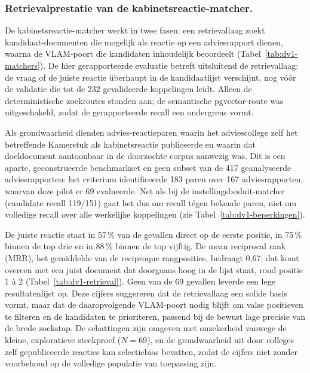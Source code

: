 
\subsubsection{Retrievalprestatie van de kabinetsreactie-matcher.}
De kabinetsreactie-matcher werkt in twee fasen: een retrievallaag zoekt
kandidaat-documenten die mogelijk als reactie op een adviesrapport dienen,
waarna de VLAM-poort die kandidaten inhoudelijk beoordeelt
(Tabel~\ref{tab:dv1-matchers}). De hier gerapporteerde evaluatie betreft
uitsluitend de retrievallaag: de vraag of de juiste reactie \"uberhaupt in de
kandidaatlijst verschijnt, nog v\'o\'or de validatie die tot de 232 gevalideerde
koppelingen leidt. Alleen de deterministische zoekroutes stonden aan; de
semantische pgvector-route was uitgeschakeld, zodat de gerapporteerde recall een
ondergrens vormt.

\noindent Als grondwaarheid dienden advies-reactieparen waarin het adviescollege
zelf het betreffende Kamerstuk als kabinetsreactie publiceerde en waarin dat
doeldocument aantoonbaar in de doorzochte corpus aanwezig was. Dit is een aparte,
geconstrueerde benchmarkset en geen subset van de 417 geanalyseerde
adviesrapporten: het criterium identificeerde 183 paren over 167 adviesrapporten,
waarvan deze pilot er 69 evalueerde. Net als bij de instellingsbesluit-matcher
(candidate recall 119/151) gaat het dus om recall t\'egen bekende paren, niet om
volledige recall over alle werkelijke koppelingen
(zie Tabel~\ref{tab:dv1-beperkingen}).

\noindent De juiste reactie staat in 57\,\% van de gevallen direct op de eerste
positie, in 75\,\% binnen de top drie en in 88\,\% binnen de top vijftig. De mean
reciprocal rank (MRR), het gemiddelde van de reciproque rangposities, bedraagt
0,67; dat komt overeen met een juist document dat doorgaans hoog in de lijst staat,
rond positie 1 \`a 2 (Tabel~\ref{tab:dv1-retrieval}). Geen van de 69 gevallen
leverde een lege resultatenlijst op. Deze cijfers suggereren dat de retrievallaag
een solide basis vormt, maar dat de daaropvolgende VLAM-poort nodig blijft om
valse positieven te filteren en de kandidaten te prioriteren, passend bij de
bewust lage precisie van de brede zoekstap. De schattingen zijn omgeven met
onzekerheid vanwege de kleine, exploratieve steekproef ($N = 69$), en de
grondwaarheid uit door colleges zelf gepubliceerde reacties kan selectiebias
bevatten, zodat de cijfers niet zonder voorbehoud op de volledige populatie van
toepassing zijn.

